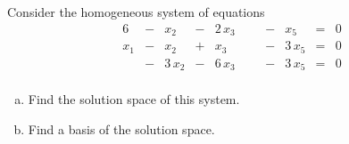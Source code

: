 
\begin{exerciseStatement}


Consider the homogeneous system of equations 
\begin{alignat*}{6}  &-& x_{2} &-& 2 \, x_{3} & &  &-& x_{5} &=& 0 \\x_{1} &-& x_{2} &+& x_{3} & &  &-& 3 \, x_{5} &=& 0 \\ &-& 3 \, x_{2} &-& 6 \, x_{3} & &  &-& 3 \, x_{5} &=& 0 \\ \end{alignat*}
            


\begin{enumerate}[(a)]
\item  Find the solution space of this system.
\item  Find a basis of the solution space.
\end{enumerate}
    
\end{exerciseStatement}
    
